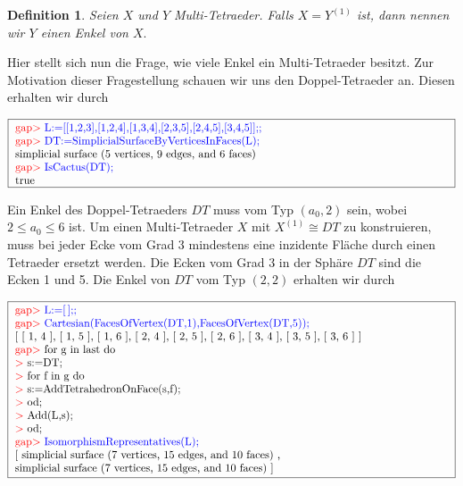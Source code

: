 \documentclass[12pt,titlepage,twoside,cleardoublepage]{article}
\theoremstyle{nummermitklammern}
\newtheorem{definition}[temp]{Definition}
\newtheorem{definition}[zahl]{Definition}
\numberwithin{equation}{section}
\begin{document}
\begin{definition}
Seien $X$ und $Y$ Multi-Tetraeder. Falls $X=Y^{(1)}$ ist, dann nennen wir $Y$ einen \emph{Enkel} von $X.$ 
\end{definition}

Hier stellt sich nun die Frage, wie viele Enkel ein Multi-Tetraeder besitzt. 
Zur Motivation dieser Fragestellung schauen wir uns den Doppel-Tetraeder an.
Diesen erhalten wir durch
\begin{center}
 $\fbox{
\parbox{14cm}{
\textcolor{red}{gap$>$} \textcolor{blue}{L:=[[1,2,3],[1,2,4],[1,3,4],[2,3,5],[2,4,5],[3,4,5]];;}\newline
\textcolor{red}{gap$>$} \textcolor{blue}{DT:=SimplicialSurfaceByVerticesInFaces(L);}\newline
simplicial surface (5 vertices, 9 edges, and 6 faces)\newline
\textcolor{red}{gap$>$} \textcolor{blue}{IsCactus(DT);}\newline
true
}}$
\end{center}
Ein Enkel des Doppel-Tetraeders $DT$ muss vom Typ $(a_0,2)$ sein, wobei $2\leq a_0 \leq 6$ ist.
Um einen Multi-Tetraeder $X$ mit $X^{(1)}\cong DT$ zu konstruieren, muss bei jeder Ecke vom Grad 3 mindestens eine inzidente Fläche durch einen Tetraeder ersetzt werden. Die Ecken vom Grad 3 in der Sphäre $DT$ sind die Ecken 1 und 5. 
Die Enkel von $DT$ vom Typ $(2,2)$ erhalten wir durch
\begin{center}
 $\fbox{
\parbox{14cm}{
\textcolor{red}{gap$>$} \textcolor{blue}{L:=[\,];;}\newline
\textcolor{red}{gap$>$} \textcolor{blue}{Cartesian(FacesOfVertex(DT,1),FacesOfVertex(DT,5));}\newline
[ [ 1, 4 ], [ 1, 5 ], [ 1, 6 ], [ 2, 4 ], [ 2, 5 ], [ 2, 6 ], [ 3, 4 ],
  [ 3, 5 ], [ 3, 6 ] ]\newline
\textcolor{red}{gap$>$} for g in last do\newline
\textcolor{red}{$>$} s:=DT;\newline
\textcolor{red}{$>$} for f in g do\newline
\textcolor{red}{$>$} s:=AddTetrahedronOnFace(s,f);\newline
\textcolor{red}{$>$} od;\newline
\textcolor{red}{$>$} Add(L,s);\newline
\textcolor{red}{$>$} od;\newline
\textcolor{red}{gap$>$} \textcolor{blue}{IsomorphismRepresentatives(L);}\newline
[ simplicial surface (7 vertices, 15 edges, and 10 faces)
    ,\newline
  simplicial surface (7 vertices, 15 edges, and 10 faces)
 ]
 }}$
 \end{center}
\end{document}
